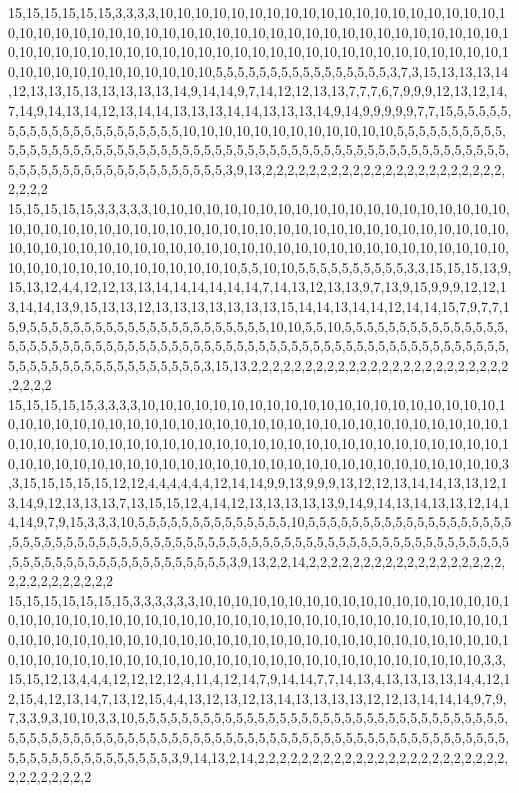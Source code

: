 15,15,15,15,15,15,3,3,3,3,10,10,10,10,10,10,10,10,10,10,10,10,10,10,10,10,10,10,10,10,10,10,10,10,10,10,10,10,10,10,10,10,10,10,10,10,10,10,10,10,10,10,10,10,10,10,10,10,10,10,10,10,10,10,10,10,10,10,10,10,10,10,10,10,10,10,10,10,10,10,10,10,10,10,10,10,10,10,10,10,10,10,10,10,10,10,10,5,5,5,5,5,5,5,5,5,5,5,5,5,5,5,5,3,7,3,15,13,13,13,14,12,13,13,15,13,13,13,13,13,14,9,14,14,9,7,14,12,12,13,13,7,7,7,6,7,9,9,9,12,13,12,14,7,14,9,14,13,14,12,13,14,14,13,13,13,14,14,13,13,13,14,9,14,9,9,9,9,9,7,7,15,5,5,5,5,5,5,5,5,5,5,5,5,5,5,5,5,5,5,5,5,5,10,10,10,10,10,10,10,10,10,10,10,10,5,5,5,5,5,5,5,5,5,5,5,5,5,5,5,5,5,5,5,5,5,5,5,5,5,5,5,5,5,5,5,5,5,5,5,5,5,5,5,5,5,5,5,5,5,5,5,5,5,5,5,5,5,5,5,5,5,5,5,5,5,5,5,5,5,5,5,5,5,5,5,5,5,5,5,5,3,9,13,2,2,2,2,2,2,2,2,2,2,2,2,2,2,2,2,2,2,2,2,2,2,2,2,2,2
15,15,15,15,15,3,3,3,3,3,10,10,10,10,10,10,10,10,10,10,10,10,10,10,10,10,10,10,10,10,10,10,10,10,10,10,10,10,10,10,10,10,10,10,10,10,10,10,10,10,10,10,10,10,10,10,10,10,10,10,10,10,10,10,10,10,10,10,10,10,10,10,10,10,10,10,10,10,10,10,10,10,10,10,10,10,10,10,10,10,10,10,10,10,10,10,10,10,10,5,5,10,10,5,5,5,5,5,5,5,5,5,5,3,3,15,15,15,13,9,15,13,12,4,4,12,12,13,13,14,14,14,14,14,14,7,14,13,12,13,13,9,7,13,9,15,9,9,9,12,12,13,14,14,13,9,15,13,13,12,13,13,13,13,13,13,13,15,14,14,13,14,14,12,14,14,15,7,9,7,7,15,9,5,5,5,5,5,5,5,5,5,5,5,5,5,5,5,5,5,5,5,5,5,5,10,10,5,5,10,5,5,5,5,5,5,5,5,5,5,5,5,5,5,5,5,5,5,5,5,5,5,5,5,5,5,5,5,5,5,5,5,5,5,5,5,5,5,5,5,5,5,5,5,5,5,5,5,5,5,5,5,5,5,5,5,5,5,5,5,5,5,5,5,5,5,5,5,5,5,5,5,5,5,5,5,5,5,5,3,15,13,2,2,2,2,2,2,2,2,2,2,2,2,2,2,2,2,2,2,2,2,2,2,2,2,2,2,2,2
15,15,15,15,15,3,3,3,3,10,10,10,10,10,10,10,10,10,10,10,10,10,10,10,10,10,10,10,10,10,10,10,10,10,10,10,10,10,10,10,10,10,10,10,10,10,10,10,10,10,10,10,10,10,10,10,10,10,10,10,10,10,10,10,10,10,10,10,10,10,10,10,10,10,10,10,10,10,10,10,10,10,10,10,10,10,10,10,10,10,10,10,10,10,10,10,10,10,10,10,10,10,10,10,10,10,10,10,10,10,10,10,10,3,3,15,15,15,15,15,12,12,4,4,4,4,4,4,12,14,14,9,9,13,9,9,9,13,12,12,13,14,14,13,13,12,13,14,9,12,13,13,13,7,13,15,15,12,4,14,12,13,13,13,13,13,9,14,9,14,13,14,13,13,12,14,14,14,9,7,9,15,3,3,3,10,5,5,5,5,5,5,5,5,5,5,5,5,5,5,10,5,5,5,5,5,5,5,5,5,5,5,5,5,5,5,5,5,5,5,5,5,5,5,5,5,5,5,5,5,5,5,5,5,5,5,5,5,5,5,5,5,5,5,5,5,5,5,5,5,5,5,5,5,5,5,5,5,5,5,5,5,5,5,5,5,5,5,5,5,5,5,5,5,5,5,5,5,5,5,5,5,5,5,5,5,3,9,13,2,2,14,2,2,2,2,2,2,2,2,2,2,2,2,2,2,2,2,2,2,2,2,2,2,2,2,2,2,2,2
15,15,15,15,15,15,15,3,3,3,3,3,3,10,10,10,10,10,10,10,10,10,10,10,10,10,10,10,10,10,10,10,10,10,10,10,10,10,10,10,10,10,10,10,10,10,10,10,10,10,10,10,10,10,10,10,10,10,10,10,10,10,10,10,10,10,10,10,10,10,10,10,10,10,10,10,10,10,10,10,10,10,10,10,10,10,10,10,10,10,10,10,10,10,10,10,10,10,10,10,10,10,10,10,10,10,10,10,10,10,10,10,10,3,3,15,15,12,13,4,4,4,12,12,12,12,4,11,4,12,14,7,9,14,14,7,7,14,13,4,13,13,13,13,14,4,12,12,15,4,12,13,14,7,13,12,15,4,4,13,12,13,12,13,14,13,13,13,13,12,12,13,14,14,14,9,7,9,7,3,3,9,3,10,10,3,3,10,5,5,5,5,5,5,5,5,5,5,5,5,5,5,5,5,5,5,5,5,5,5,5,5,5,5,5,5,5,5,5,5,5,5,5,5,5,5,5,5,5,5,5,5,5,5,5,5,5,5,5,5,5,5,5,5,5,5,5,5,5,5,5,5,5,5,5,5,5,5,5,5,5,5,5,5,5,5,5,5,5,5,5,5,5,5,5,5,5,5,5,5,5,5,5,3,9,14,13,2,14,2,2,2,2,2,2,2,2,2,2,2,2,2,2,2,2,2,2,2,2,2,2,2,2,2,2,2,2,2,2,2
